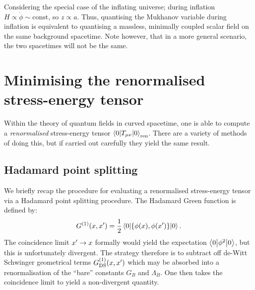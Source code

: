 Considering the special case of the inflating universe; during inflation $H\propto\dot{\phi}\sim\mathrm{const}$, so $z\propto a$. Thus, quantising the Mukhanov variable during inflation is equivalent to quantising a massless, minimally coupled scalar field on the same background spacetime. Note however, that in a more general scenario, the two spacetimes will not be the same.

\section{Minimising the renormalised stress-energy tensor}
Within the theory of quantum fields in curved spacetime, one is able to compute a {\em renormalised\/} stress-energy tensor $\left\langle0\middle|T_{\mu\nu}\middle|0\right\rangle_\mathrm{ren}$. There are a variety of methods of doing this, but if carried out carefully they yield the same result.

\subsection{Hadamard point splitting}
We briefly recap the procedure for evaluating a renormalised stress-energy tensor via a Hadamard point splitting procedure.  
The Hadamard Green function is defined by:
\begin{equation}
  G^{(1)}(x,{{x}^\prime}) =\frac{1}{2} \left\langle0\middle|\left\{ \phi(x),\phi({{x}^\prime}) \right\}\middle|0\right\rangle.
  \label{eqn:green_function}
\end{equation}
The coincidence limit ${{x}^\prime}\to x$ formally would yield the expectation $\left\langle0\middle|\phi^2\middle|0\right\rangle$, but this is unfortunately divergent. The strategy therefore is to subtract off de-Witt Schwinger geometrical terms $G^{(1)}_\mathrm{DS}(x,{{x}^\prime})$ which may be absorbed into a renormalisation of the ``bare'' constants $G_B$ and $\Lambda_B$. One then takes the coincidence limit to yield a non-divergent quantity. 

